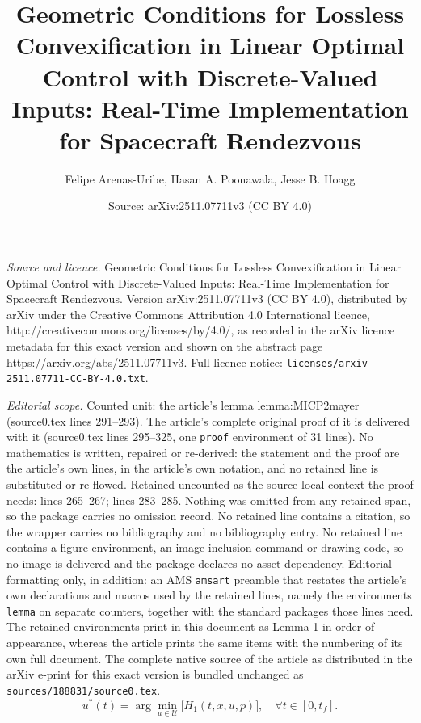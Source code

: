 \documentclass[10pt,a4paper]{amsart}
\title{Geometric Conditions for Lossless Convexification in Linear Optimal Control with Discrete-Valued Inputs: Real-Time Implementation for Spacecraft Rendezvous}
\author{Felipe Arenas-Uribe, Hasan A. Poonawala, Jesse B. Hoagg}
\date{Source: arXiv:2511.07711v3 (CC BY 4.0)}
\newcommand{\SU}{{\mathcal U}}
\begin{document}
\maketitle

\noindent\emph{Source and licence.} Geometric Conditions for Lossless Convexification in Linear Optimal Control with Discrete-Valued Inputs: Real-Time Implementation for Spacecraft Rendezvous. Version arXiv:2511.07711v3 (CC BY 4.0), distributed by arXiv under the Creative Commons Attribution 4.0 International licence, http://creativecommons.org/licenses/by/4.0/, as recorded in the arXiv licence metadata for this exact version and shown on the abstract page https://arxiv.org/abs/2511.07711v3. Full licence notice: \texttt{licenses/arxiv-2511.07711-CC-BY-4.0.txt}.\par\smallskip

\noindent\textit{Editorial scope.} Counted unit: the article's lemma lemma:MICP2mayer (source0.tex lines 291--293). The article's complete original proof of it is delivered with it (source0.tex lines 295--325, one \texttt{proof} environment of 31 lines). No mathematics is written, repaired or re-derived: the statement and the proof are the article's own lines, in the article's own notation, and no retained line is substituted or re-flowed.  Retained uncounted as the source-local context the proof needs: lines 265--267; lines 283--285.  Nothing was omitted from any retained span, so the package carries no omission record.  No retained line contains a citation, so the wrapper carries no bibliography and no bibliography entry.  No retained line contains a figure environment, an image-inclusion command or drawing code, so no image is delivered and the package declares no asset dependency.  Editorial formatting only, in addition: an AMS \texttt{amsart} preamble that restates the article's own declarations and macros used by the retained lines, namely the environments \texttt{lemma} on separate counters, together with the standard packages those lines need.  The retained environments print in this document as Lemma 1 in order of appearance, whereas the article prints the same items with the numbering of its own full document.  The complete native source of the article as distributed in the arXiv e-print for this exact version is bundled unchanged as \texttt{sources/188831/source0.tex}.
\begin{equation}\label{eq:optimal_control_p1}
    u^*(t) = \arg \min_{u \in \SU} \big[ H_1(t,x,u,p) \big], \quad \forall t \in [0,t_f].
\end{equation}
\end{document}
